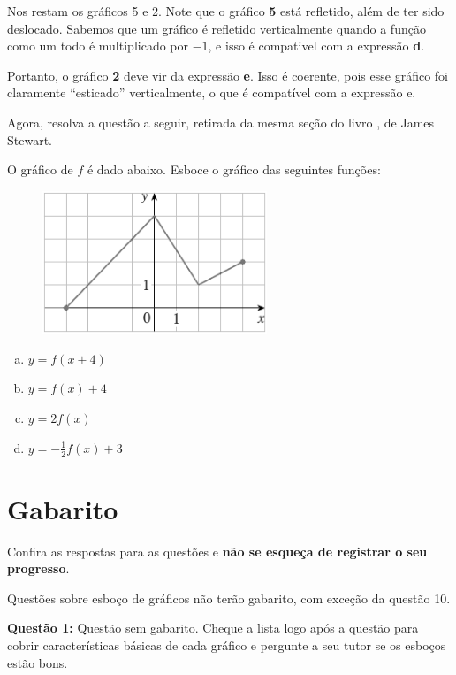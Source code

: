 \documentclass[main_estudante.tex]{subfiles}
\begin{document}
Nos restam os gráficos 5 e 2. Note que o gráfico \textbf{5} está refletido, além de ter sido deslocado. Sabemos que um gráfico é refletido verticalmente quando a função como um todo é multiplicado por $-1$, e isso é compativel com a expressão \textbf{d}.

Portanto, o gráfico \textbf{2} deve vir da expressão \textbf{e}. Isso é coerente, pois esse gráfico foi claramente ``esticado'' verticalmente, o que é compatível  com a expressão e.

Agora, resolva a questão a seguir, retirada da mesma seção do livro , de James Stewart.

\begin{resolva}
O gráfico de $f$ é dado abaixo. Esboce o gráfico das seguintes funções:

\begin{figure}[h]
\centering
\includegraphics[width=0.6\textwidth]{./img/c7r2.png}
\end{figure}

\begin{enumerate}[a)]
\item $y=f(x+4)$
\item $y=f(x)+4$
\item $y=2f(x)$
\item $y= -\frac{1}{2}f(x)+3$
\end{enumerate}
\end{resolva}

\newpage

\section{Gabarito}

Confira as respostas para as questões e \textbf{não se esqueça de registrar o seu progresso}.

Questões sobre esboço de gráficos não terão gabarito, com exceção da questão 10.

\noindent\textbf{Questão 1:} Questão sem gabarito. Cheque a lista logo após a questão para cobrir características básicas de cada gráfico e pergunte a seu tutor se os esboços estão bons.
\end{document}
